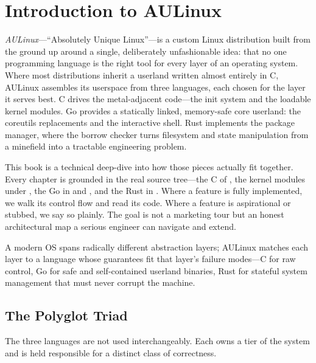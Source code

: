 \chapter{Introduction to AULinux}
\label{chap:intro}

\noindent
\emph{AULinux}---``Absolutely Unique Linux''---is a custom Linux distribution
built from the ground up around a single, deliberately unfashionable idea: that
no one programming language is the right tool for every layer of an operating
system. Where most distributions inherit a userland written almost entirely in
C, AULinux assembles its userspace from three languages, each chosen for the
layer it serves best. C drives the metal-adjacent code---the init system and the
loadable kernel modules. Go provides a statically linked, memory-safe core
userland: the coreutils replacements and the interactive shell. Rust implements
the package manager, where the borrow checker turns filesystem and state
manipulation from a minefield into a tractable engineering problem.

This book is a technical deep-dive into how those pieces actually fit together.
Every chapter is grounded in the real source tree---the C of ,
the kernel modules under , the Go in  and
, and the Rust in . Where a feature is
fully implemented, we walk its control flow and read its code. Where a feature
is aspirational or stubbed, we say so plainly. The goal is not a marketing tour
but an honest architectural map a serious engineer can navigate and extend.

\begin{infobox}
A modern OS spans radically different abstraction layers; AULinux matches each
layer to a language whose guarantees fit that layer's failure modes---C for raw
control, Go for safe and self-contained userland binaries, Rust for stateful
system management that must never corrupt the machine.
\end{infobox}

\section{The Polyglot Triad}

The three languages are not used interchangeably. Each owns a tier of the system
and is held responsible for a distinct class of correctness.

